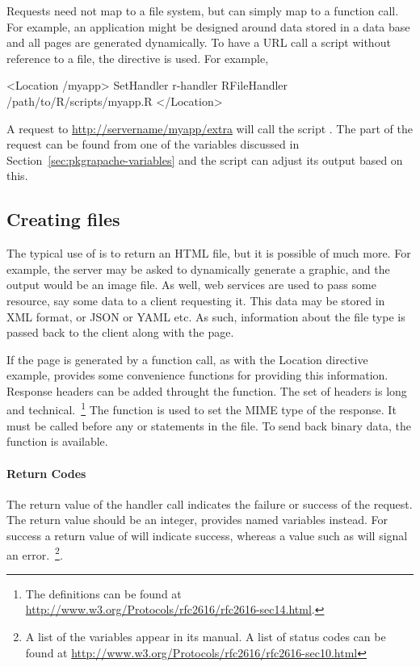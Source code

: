 Requests need not map to a file system, but can simply map to a
function call. For example, an application might be designed around
data stored in a data base and all pages are generated dynamically. To
have a URL call a script without reference to a file, the
 directive is used. For example,
\begin{HTMLinput}
<Location /myapp>
  SetHandler r-handler
  RFileHandler /path/to/R/scripts/myapp.R
</Location>
\end{HTMLinput}
A request to \url{http://servername/myapp/extra} will call the script
. The  part of the request can be found from
one of the  variables discussed in
Section~\ref{sec:pkgrapache-variables} and the script can adjust its
output based on this.


\subsection{Creating files}
\label{sec:creating-files}

The typical use of  is to return an HTML file, but it is
possible of much more. For example, the server may be asked to
dynamically generate a graphic, and the output would be an image
file. As well, web services are used to pass some resource, say some
data to a client requesting it. This data may be stored in XML format,
or JSON or YAML etc. As such, information about the file type is passed back to the
client along with the page.  

If the page is generated by a function call, as with the Location
directive example,  provides some convenience functions
for providing this information.  Response headers can be added
throught the  function. The set of headers is long
and technical.~\footnote{The definitions can be found at
  \url{http://www.w3.org/Protocols/rfc2616/rfc2616-sec14.html}.}  The
 function is used to set the MIME type of the
response. It must be called before any  or
 statements in the file.  To send back binary data, the
function  is available.


\paragraph{Return Codes}
The return value of the handler call indicates the failure or success
of the request.  The return value should be an integer, 
provides named variables instead. For success a return value of
 will indicate success, whereas a value such as
 will signal an error.~\footnote{A list of
  the  variables appear in its manual. A list of status
  codes can be found at \url{http://www.w3.org/Protocols/rfc2616/rfc2616-sec10.html}}. 


